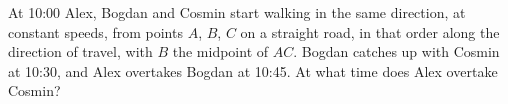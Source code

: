 At 10:00 Alex, Bogdan and Cosmin start walking in the same direction, at constant speeds, from points $A$, $B$, $C$ on a straight road, in that order along the direction of travel, with $B$ the midpoint of $AC$. Bogdan catches up with Cosmin at 10:30, and Alex overtakes Bogdan at 10:45. At what time does Alex overtake Cosmin?
